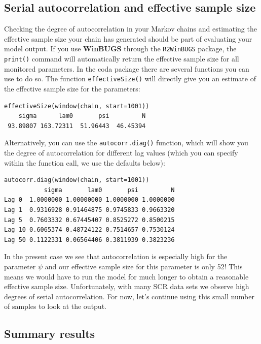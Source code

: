 \subsection{Serial autocorrelation and effective sample size}

Checking the degree of autocorrelation in your Markov chains and
estimating the effective sample size your chain has generated should
be part of evaluating your model output. If you use {\bf WinBUGS}
 through the \mbox{\tt R2WinBUGS} package, the \verb#print()# command
 will automatically return the effective sample size for all monitored
 parameters. In the coda package there are several functions you can use
 to do so. The function \verb#effectiveSize()# will directly give you an estimate
 of the effective sample size for the parameters:
\begin{verbatim}
effectiveSize(window(chain, start=1001))
    sigma      lam0       psi         N
 93.89807 163.72311  51.96443  46.45394
\end{verbatim}

Alternatively, you can use the \verb#autocorr.diag()# function, which will show you the degree of autocorrelation for different lag values (which you can specify within the function call, we use the defaults below):
\begin{verbatim}
autocorr.diag(window(chain, start=1001))
           sigma       lam0       psi         N
Lag 0  1.0000000 1.00000000 1.0000000 1.0000000
Lag 1  0.9316928 0.91464875 0.9745833 0.9663320
Lag 5  0.7603332 0.67445407 0.8525272 0.8500215
Lag 10 0.6065374 0.48724122 0.7514657 0.7530124
Lag 50 0.1122331 0.06564406 0.3811939 0.3823236
\end{verbatim}
In the present case we see that autocorrelation is especially high for the
parameter $\psi$ and our effective sample size for this parameter is
only 52!
This means we would have to run the model for much longer to
obtain a reasonable effective sample size. Unfortunately, with many SCR data sets we observe high degrees of serial autocorrelation. For now, let's continue using this small number of samples to look at the output.


\subsection{Summary results}
\label{mcmc.sec.mcmcsummary}

